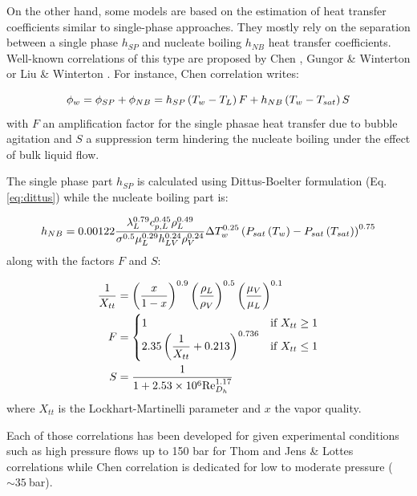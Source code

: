 \npar

On the other hand, some models are based on the estimation of heat transfer coefficients similar to single-phase approaches. They mostly rely on the separation between a single phase $h_{SP}$ and nucleate boiling $h_{NB}$ heat transfer coefficients. Well-known correlations of this type are proposed by Chen \cite{chen_correlation_1966}, Gungor \& Winterton \cite{gungor_general_1986} or Liu \& Winterton \cite{liu_general_1991}. For instance, Chen correlation writes:

\begin{equation}
\phi_{w} = \phi_{SP} + \phi_{NB} = h_{SP}\left( T_{w}-T_{L} \right)F + h_{NB}\left( T_{w}-T_{sat} \right)S
\end{equation}
with $F$ an amplification factor for the single phasae heat transfer due to bubble agitation and $S$ a suppression term hindering the nucleate boiling under the effect of bulk liquid flow.

\npar
The single phase part $h_{SP}$ is calculated using Dittus-Boelter \cite{dittus_heat_1985} formulation (Eq. \ref{eq:dittus}) while the nucleate boiling part is:

\begin{equation}
h_{NB} = 0.00122 \frac{\lambda_{L}^{0.79} c_{p,L}^{0.45} \rho_{L}^{0.49}}{\sigma^{0.5} \mu_{L}^{0.29} h_{LV}^{0.24}\rho_{V}^{0.24}} \Delta T_{w}^{0.25} \left( P_{sat}\left( T_{w} \right) - P_{sat}\left( T_{sat} \right) \right)^{0.75}
\end{equation}
along with the factors $F$ and $S$:

\begin{align}
\frac{1}{X_{tt}} & = \parth{\frac{x}{1-x}}^{0.9} \parth{\frac{\rho_{L}}{\rho_{V}}}^{0.5} \parth{\frac{\mu_{V}}{\mu_{L}}}^{0.1} \\
F &= 
\begin{cases}
1\ &\text{if}\ X_{tt}\geq 1\\
2.35 \parth{\dfrac{1}{X_{tt}} + 0.213}^{0.736} &\text{if}\ X_{tt}\leq 1
\end{cases}
\\
%
S &= \dfrac{1}{1+ 2.53\times 10^{6} \Re_{D_{h}}^{1.17}}
\end{align}
where $X_{tt}$ is the Lockhart-Martinelli parameter \cite{lockhart_proposed_nodate} and $x$ the vapor quality.

\npar

Each of those correlations has been developed for given experimental conditions such as high pressure flows up to 150 bar for Thom and Jens \& Lottes correlations while Chen correlation is dedicated for low to moderate pressure ($\sim 35\ $bar).


